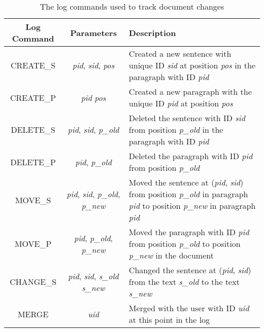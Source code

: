\begin{table}[h!]
\begin{center}
 \begin{tabular} {|c|c|p{8cm}|}
  \hline
  Log Command & Parameters & Description \\
  \hline \hline
  CREATE\_S & \emph{pid}, \emph{sid}, \emph{pos} & Created a new sentence with unique ID \emph{sid} at position \emph{pos} in the paragraph with ID \emph{pid} \\
  \hline
  CREATE\_P & \emph{pid} \emph{pos} & Created a new paragraph with the unique ID \emph{pid} at position \emph{pos} \\
  \hline
  DELETE\_S & \emph{pid}, \emph{sid}, \emph{p\_old} & Deleted the sentence with ID \emph{sid} from position \emph{p\_old} in the paragraph with ID \emph{pid} \\
  \hline
  DELETE\_P & \emph{pid}, \emph{p\_old} & Deleted the paragraph with ID \emph{pid} from position \emph{p\_old} \\
  \hline
  MOVE\_S & \emph{pid}, \emph{sid}, \emph{p\_old}, \emph{p\_new} & Moved the sentence at (\emph{pid}, \emph{sid}) 
                                                                         from position \emph{p\_old} in paragraph \emph{pid} 
                                                                         to position \emph{p\_new} in paragraph \emph{pid} \\
  \hline
  MOVE\_P & \emph{pid}, \emph{p\_old}, \emph{p\_new} & Moved the paragraph with ID \emph{pid} from position \emph{p\_old} 
                                                                                              to position \emph{p\_new} in the document \\ 
  \hline
  CHANGE\_S & \emph{pid}, \emph{sid}, \emph{s\_old} \emph{s\_new} & Changed the sentence at (\emph{pid}, \emph{sid}) from the text \emph{s\_old}
                                                              to the text \emph{s\_new}  \\
  \hline
  MERGE & \emph{uid} & Merged with the user with ID \emph{uid} at this point in the log \\
  \hline
 \end{tabular}
\end{center}
\caption{The log commands used to track document changes}
\label{table:log_commands}
\end{table}

